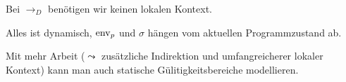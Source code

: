\begin{remark}
    Bei $\to_D$ benötigen wir keinen lokalen Kontext.

    Alles ist dynamisch, \dh{} $\operatorname{env}_p$ und $\sigma$ hängen vom aktuellen Programmzustand ab.

    Mit mehr Arbeit ($\leadsto$ zusätzliche Indirektion und umfangreicherer lokaler Kontext) kann man auch statische Gülitigkeitsbereiche modellieren.
\end{remark}
